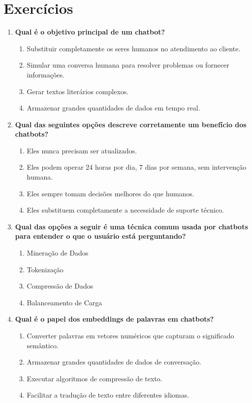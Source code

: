 \documentclass[14pt,a4paper,oneside]{book}
\begin{document}

\section{Exercícios}

\begin{enumerate}

\item \textbf{Qual é o objetivo principal de um chatbot?} 
\begin{enumerate}[label=\alph*)]
\item Substituir completamente os seres humanos no atendimento ao cliente. 
\item Simular uma conversa humana para resolver problemas ou fornecer informações. 
\item Gerar textos literários complexos. 
\item Armazenar grandes quantidades de dados em tempo real. 
\end{enumerate}

\item \textbf{Qual das seguintes opções descreve corretamente um benefício dos chatbots?} 
\begin{enumerate}[label=\alph*)]
\item Eles nunca precisam ser atualizados. 
\item Eles podem operar 24 horas por dia, 7 dias por semana, sem intervenção humana. 
\item Eles sempre tomam decisões melhores do que humanos. 
\item Eles substituem completamente a necessidade de suporte técnico. 
\end{enumerate}

\item \textbf{Qual das opções a seguir é uma técnica comum usada por chatbots para entender o que o usuário está perguntando?} 
\begin{enumerate}[label=\alph*)]
\item Mineração de Dados 
\item Tokenização 
\item Compressão de Dados 
\item Balanceamento de Carga 
\end{enumerate}

\item \textbf{Qual é o papel dos embeddings de palavras em chatbots?} 
\begin{enumerate}[label=\alph*)]
\item Converter palavras em vetores numéricos que capturam o significado semântico. 
\item Armazenar grandes quantidades de dados de conversação. 
\item Executar algoritmos de compressão de texto. 
\item Facilitar a tradução de texto entre diferentes idiomas. 
\end{enumerate}


\end{enumerate}
\end{document}
